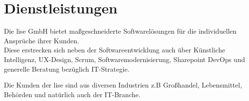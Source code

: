 \section{Dienstleistungen}\label{sec:dienstleistungen}
Die lise GmbH bietet maßgeschneiderte Softwarelösungen für die individuellen Ansprüche ihrer Kunden.\\
Diese erstrecken sich neben der Softwareentwicklung auch über Künstliche Intelligenz, UX-Design, Scrum,
Softwaremodernisierung, Sharepoint DevOps und generelle Beratung bezüglich IT-Strategie.\autocite[/ueber-uns/unternehmen]{LiseWeb}

Die Kunden der lise sind aus diversen Industrien z.B Großhandel, Lebensmittel, Behörden und natürlich auch der IT-Branche.






